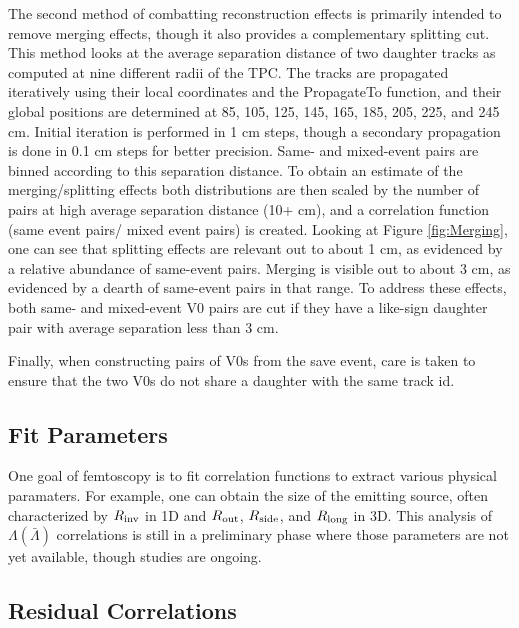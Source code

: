 The second method of combatting reconstruction effects is primarily intended to remove merging effects, though it also provides a complementary splitting cut.  This method looks at the average separation distance of two daughter tracks as computed at nine different radii of the TPC.  The tracks are propagated iteratively using their local coordinates and the PropagateTo function, and their global positions are determined at 85, 105, 125, 145, 165, 185, 205, 225, and 245 cm.  Initial iteration is performed in 1 cm steps, though a secondary propagation is done in 0.1 cm steps for better precision.  Same- and mixed-event pairs are binned according to this separation distance.  To obtain an estimate of the merging/splitting effects both distributions are then scaled by the number of pairs at high average separation distance (10+ cm), and a correlation function (same event pairs/ mixed event pairs) is created.  Looking at Figure \ref{fig:Merging}, one can see that splitting effects are relevant out to about 1 cm, as evidenced by a relative abundance of same-event pairs.  Merging is visible out to about 3 cm, as evidenced by a dearth of same-event pairs in that range.  To address these effects, both same- and mixed-event V0 pairs are cut if they have a like-sign daughter pair with average separation less than 3 cm.

Finally, when constructing pairs of V0s from the save event, care is taken to ensure that the two V0s do not share a daughter with the same track id. 

\subsection{Fit Parameters}
\label{sec:Parameters}

One goal of femtoscopy is to fit correlation functions to extract various physical paramaters.  For example, one can obtain the size of the emitting source, often characterized by $R_{\rm inv}$ in 1D and $R_{\rm out}$, $R_{\rm side}$, and $R_{\rm long}$ in 3D.  This analysis of $\Lambda(\bar{\Lambda})$ correlations is still in a preliminary phase where those parameters are not yet available, though studies are ongoing.  

\subsection{Residual Correlations}
\label{sec:Residual}

